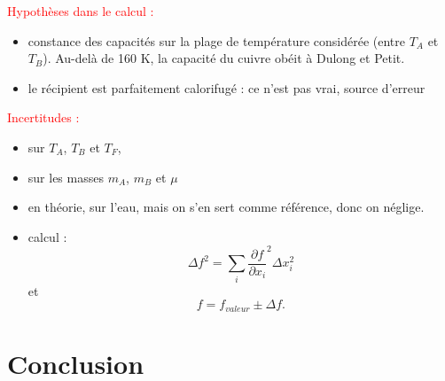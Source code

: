 \documentclass[11pt,a4paper]{report}
\begin{document}
\textcolor{red}{Hypothèses dans le calcul :} 
\begin{itemize}
	\item constance des capacités sur la plage de température considérée (entre $T_A$ et $T_B$). Au-delà de 160 K, la capacité du cuivre obéit à Dulong et Petit. 
	\item le récipient est parfaitement calorifugé : ce n'est pas vrai, source d'erreur
\end{itemize}
\textcolor{red}{Incertitudes :}
\begin{itemize}
	\item sur $T_A$, $T_B$ et $T_F$,
	\item sur les masses $m_A$, $m_B$ et $\mu$
	\item en théorie, sur l'eau, mais on s'en sert comme référence, donc on néglige.
	\item calcul :
	\begin{equation}
		\Delta f^2 = \sum_i \frac{\partial f}{\partial x_i}^2 \Delta x_i^2
	\end{equation}
	et
	\begin{equation}
		f = f_{valeur} \pm \Delta f.
	\end{equation}
\end{itemize}

\section{Conclusion}
\end{document}
